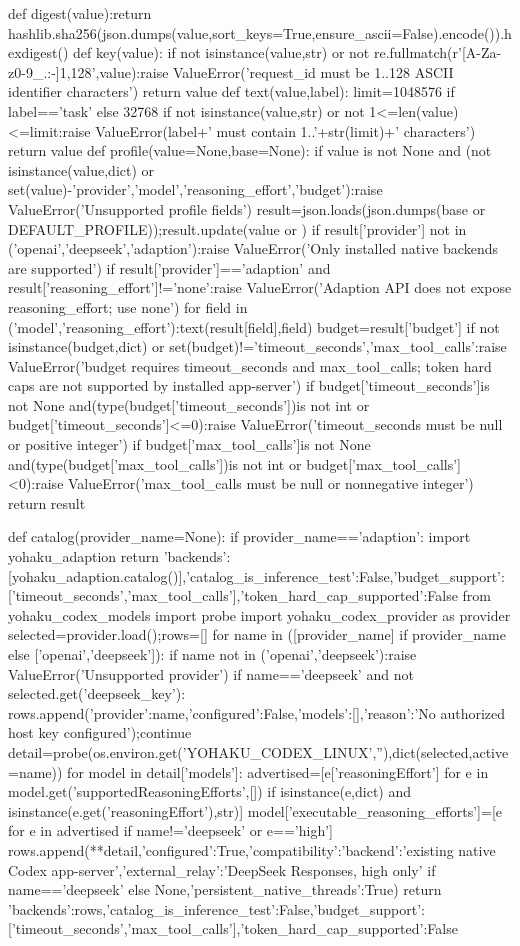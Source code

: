 def digest(value):return hashlib.sha256(json.dumps(value,sort_keys=True,ensure_ascii=False).encode()).hexdigest()
def key(value):
 if not isinstance(value,str) or not re.fullmatch(r'[A-Za-z0-9_.:-]{1,128}',value):raise ValueError('request_id must be 1..128 ASCII identifier characters')
 return value
def text(value,label):
 limit=1048576 if label=='task' else 32768
 if not isinstance(value,str) or not 1<=len(value)<=limit:raise ValueError(label+' must contain 1..'+str(limit)+' characters')
 return value
def profile(value=None,base=None):
 if value is not None and (not isinstance(value,dict) or set(value)-{'provider','model','reasoning_effort','budget'}):raise ValueError('Unsupported profile fields')
 result=json.loads(json.dumps(base or DEFAULT_PROFILE));result.update(value or {})
 if result['provider'] not in ('openai','deepseek','adaption'):raise ValueError('Only installed native backends are supported')
 if result['provider']=='adaption' and result['reasoning_effort']!='none':raise ValueError('Adaption API does not expose reasoning_effort; use none')
 for field in ('model','reasoning_effort'):text(result[field],field)
 budget=result['budget']
 if not isinstance(budget,dict) or set(budget)!={'timeout_seconds','max_tool_calls'}:raise ValueError('budget requires timeout_seconds and max_tool_calls; token hard caps are not supported by installed app-server')
 if budget['timeout_seconds']is not None and(type(budget['timeout_seconds'])is not int or budget['timeout_seconds']<=0):raise ValueError('timeout_seconds must be null or positive integer')
 if budget['max_tool_calls']is not None and(type(budget['max_tool_calls'])is not int or budget['max_tool_calls']<0):raise ValueError('max_tool_calls must be null or nonnegative integer')
 return result

def catalog(provider_name=None):
 if provider_name=='adaption':
  import yohaku_adaption
  return {'backends':[yohaku_adaption.catalog()],'catalog_is_inference_test':False,'budget_support':['timeout_seconds','max_tool_calls'],'token_hard_cap_supported':False}
 from yohaku_codex_models import probe
 import yohaku_codex_provider as provider
 selected=provider.load();rows=[]
 for name in ([provider_name] if provider_name else ['openai','deepseek']):
  if name not in ('openai','deepseek'):raise ValueError('Unsupported provider')
  if name=='deepseek' and not selected.get('deepseek_key'):
   rows.append({'provider':name,'configured':False,'models':[],'reason':'No authorized host key configured'});continue
  detail=probe(os.environ.get('YOHAKU_CODEX_LINUX',''),dict(selected,active=name))
  for model in detail['models']:
   advertised=[e['reasoningEffort'] for e in model.get('supportedReasoningEfforts',[]) if isinstance(e,dict) and isinstance(e.get('reasoningEffort'),str)]
   model['executable_reasoning_efforts']=[e for e in advertised if name!='deepseek' or e=='high']
  rows.append({**detail,'configured':True,'compatibility':{'backend':'existing native Codex app-server','external_relay':'DeepSeek Responses, high only' if name=='deepseek' else None,'persistent_native_threads':True}})
 return {'backends':rows,'catalog_is_inference_test':False,'budget_support':['timeout_seconds','max_tool_calls'],'token_hard_cap_supported':False}


